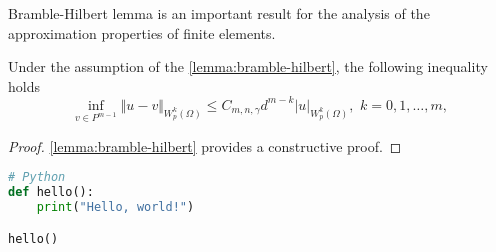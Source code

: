 \documentclass{article}
\begin{document}
\begin{note}
    Bramble-Hilbert lemma is an important result for the analysis of the approximation properties of finite elements.
\end{note}

\begin{corollary}
    Under the assumption of the \autoref{lemma:bramble-hilbert}, the following inequality holds
    \begin{equation}
        \inf_{v \in P^{m-1}} \Vert u - v \Vert_{W^k_p(\Omega)} \le C_{m,n,\gamma} d^{m-k} |u|_{W^k_p(\Omega)}, \,\, k = 0,1,\dots,m,
    \end{equation}
\end{corollary}
\begin{proof}
    \autoref{lemma:bramble-hilbert} provides a constructive proof.
\end{proof}

\begin{lstlisting}[language=Python]
# Python
def hello():
    print("Hello, world!")

hello()
\end{lstlisting}
\end{document}
